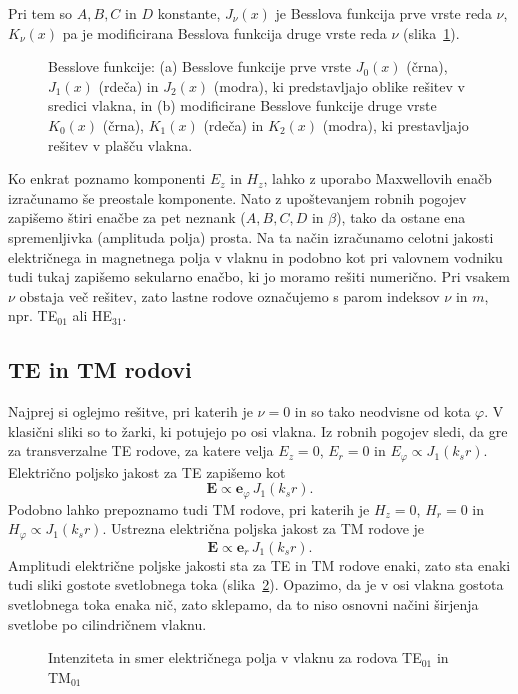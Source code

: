Pri tem so $A,B,C$ in $D$ konstante, $J_\nu(x)$ je Besslova funkcija prve vrste reda 
$\nu$, $K_\nu(x)$ pa je modificirana Besslova funkcija druge vrste reda $\nu$ 
(slika~\ref{fig:J01}). 
\begin{figure}[h]
\centering
\def\svgwidth{140truemm} 
 
\caption{Besslove funkcije: (a) Besslove funkcije prve vrste 
$J_0(x)$ (črna), $J_1(x)$ (rdeča) in $J_2(x)$ (modra), 
ki predstavljajo oblike rešitev v sredici vlakna, in (b)
modificirane Besslove funkcije druge vrste $K_0(x)$ (črna), $K_1(x)$ (rdeča) in $K_2(x)$ (modra), 
ki prestavljajo rešitev v plašču vlakna.}
\label{fig:J01}
\end{figure}

Ko enkrat poznamo komponenti $E_z$ in $H_z$, lahko z uporabo Maxwellovih enačb izračunamo še 
preostale komponente. Nato z upoštevanjem robnih pogojev zapišemo štiri enačbe za 
pet neznank ($A,B,C,D$ in $\beta$),
tako da ostane ena spremenljivka (amplituda polja) prosta. Na ta način izračunamo celotni 
jakosti električnega in magnetnega polja v vlaknu in podobno kot pri valovnem vodniku 
tudi tukaj zapišemo sekularno enačbo, ki jo moramo rešiti numerično. Pri vsakem $\nu$ obstaja 
več rešitev, zato lastne rodove označujemo s parom indeksov $\nu$ in $m$, npr. TE$_{01}$ ali 
HE$_{31}$.

\subsection*{TE in TM rodovi}
Najprej si oglejmo rešitve, pri katerih je $\nu=0$ in so tako neodvisne od kota $\varphi$. 
V klasični sliki so to žarki, ki potujejo po osi vlakna. Iz robnih pogojev sledi, da 
gre za transverzalne TE rodove, za katere velja $E_z=0$, $E_r=0$ in $E_\varphi \propto J_1(k_sr)$.
Električno poljsko jakost za TE zapišemo kot 
\begin{equation}
\mathbf{E} \propto \mathbf{e}_\varphi \, J_1(k_s r).
\end{equation}
Podobno lahko prepoznamo tudi TM rodove, pri katerih je $H_z=0$, $H_r=0$ in $H_\varphi \propto J_1(k_sr)$.
Ustrezna električna poljska jakost za TM rodove je
\begin{equation}
\mathbf{E} \propto \mathbf{e}_r \, J_1(k_s r).
\end{equation}
Amplitudi električne poljske jakosti sta za TE in TM rodove enaki, zato
sta enaki tudi sliki gostote svetlobnega toka (slika~\ref{fig:TE01}). Opazimo, da je v osi
vlakna gostota svetlobnega toka enaka nič, zato sklepamo, da to niso osnovni načini 
širjenja svetlobe po cilindričnem vlaknu. 
\begin{figure}[h]
\centering
\def\svgwidth{100truemm} 

\caption{Intenziteta in smer električnega polja v vlaknu za rodova TE$_{01}$ in TM$_{01}$
}
\label{fig:TE01}
\end{figure}

